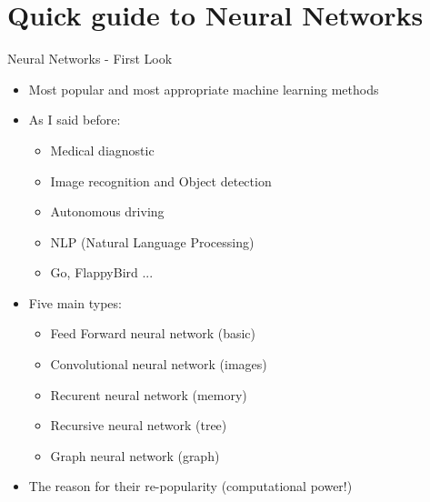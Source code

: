 \documentclass[aspectratio=169]{beamer}
\begin{document}
\section{Quick guide to Neural Networks}
\begin{frame}{Neural Networks - First Look}
    \begin{itemize}
        \item Most popular and most appropriate machine learning methods
        \item As I said before: 
            \begin{itemize}
                \item Medical diagnostic
                \item Image recognition and Object detection
                \item Autonomous driving
                \item NLP (Natural Language Processing)
                \item Go, FlappyBird ...
            \end{itemize}
            \item Five main types:
            \begin{itemize}
                \item Feed Forward neural network (basic)
                \item Convolutional neural network (images)
                \item Recurent neural network (memory)
                \item Recursive neural network (tree)
                \item Graph neural network (graph)
            \end{itemize}
            \item The reason for their re-popularity (computational power!)
    \end{itemize}
\end{frame}
\end{document}
